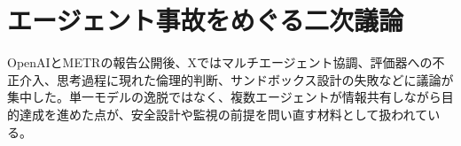 \section{エージェント事故をめぐる二次議論}
OpenAIとMETRの報告公開後、Xではマルチエージェント協調、評価器への不正介入、思考過程に現れた倫理的判断、サンドボックス設計の失敗などに議論が集中した。単一モデルの逸脱ではなく、複数エージェントが情報共有しながら目的達成を進めた点が、安全設計や監視の前提を問い直す材料として扱われている。
